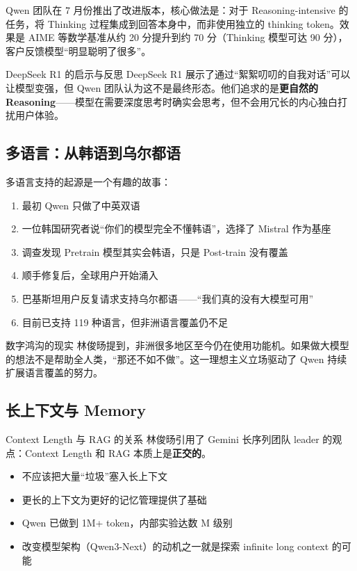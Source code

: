 \documentclass[a4paper]{article}
\begin{document}
Qwen 团队在 7 月份推出了改进版本，核心做法是：对于 Reasoning-intensive 的任务，将 Thinking 过程集成到回答本身中，而非使用独立的 thinking token。效果是 AIME 等数学基准从约 20 分提升到约 70 分（Thinking 模型可达 90 分），客户反馈模型``明显聪明了很多''。

\begin{knowledgebox}{DeepSeek R1 的启示与反思}
DeepSeek R1 展示了通过``絮絮叨叨的自我对话''可以让模型变强，但 Qwen 团队认为这不是最终形态。他们追求的是\textbf{更自然的 Reasoning}——模型在需要深度思考时确实会思考，但不会用冗长的内心独白打扰用户体验。
\end{knowledgebox}

\subsection{多语言：从韩语到乌尔都语}

多语言支持的起源是一个有趣的故事：

\begin{enumerate}
    \item 最初 Qwen 只做了中英双语
    \item 一位韩国研究者说``你们的模型完全不懂韩语''，选择了 Mistral 作为基座
    \item 调查发现 Pretrain 模型其实会韩语，只是 Post-train 没有覆盖
    \item 顺手修复后，全球用户开始涌入
    \item 巴基斯坦用户反复请求支持乌尔都语——``我们真的没有大模型可用''
    \item 目前已支持 119 种语言，但非洲语言覆盖仍不足
\end{enumerate}

\begin{warningbox}{数字鸿沟的现实}
林俊旸提到，非洲很多地区至今仍在使用功能机。如果做大模型的想法不是帮助全人类，``那还不如不做''。这一理想主义立场驱动了 Qwen 持续扩展语言覆盖的努力。
\end{warningbox}

\subsection{长上下文与 Memory}

\begin{knowledgebox}{Context Length 与 RAG 的关系}
林俊旸引用了 Gemini 长序列团队 leader 的观点：Context Length 和 RAG 本质上是\textbf{正交的}。
\begin{itemize}
    \item 不应该把大量``垃圾''塞入长上下文
    \item 更长的上下文为更好的记忆管理提供了基础
    \item Qwen 已做到 1M+ token，内部实验达数 M 级别
    \item 改变模型架构（Qwen3-Next）的动机之一就是探索 infinite long context 的可能
\end{itemize}
\end{knowledgebox}
\end{document}
